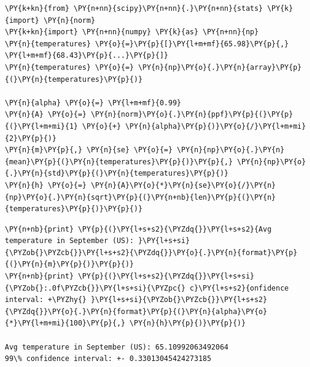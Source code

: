 \begin{Answer}
\begin{tcolorbox}[size=fbox, boxrule=1pt, colback=cellbackground, colframe=cellborder]
\begin{Verbatim}[commandchars=\\\{\}]
\PY{k+kn}{from} \PY{n+nn}{scipy}\PY{n+nn}{.}\PY{n+nn}{stats} \PY{k}{import} \PY{n}{norm}
\PY{k+kn}{import} \PY{n+nn}{numpy} \PY{k}{as} \PY{n+nn}{np}
\PY{n}{temperatures} \PY{o}{=}\PY{p}{[}\PY{l+m+mf}{65.98}\PY{p}{,} \PY{l+m+mf}{68.43}\PY{p}{...}\PY{p}{]}
\PY{n}{temperatures} \PY{o}{=} \PY{n}{np}\PY{o}{.}\PY{n}{array}\PY{p}{(}\PY{n}{temperatures}\PY{p}{)}

\PY{n}{alpha} \PY{o}{=} \PY{l+m+mf}{0.99}
\PY{n}{A} \PY{o}{=} \PY{n}{norm}\PY{o}{.}\PY{n}{ppf}\PY{p}{(}\PY{p}{(}\PY{l+m+mi}{1} \PY{o}{+} \PY{n}{alpha}\PY{p}{)}\PY{o}{/}\PY{l+m+mi}{2}\PY{p}{)}
\PY{n}{m}\PY{p}{,} \PY{n}{se} \PY{o}{=} \PY{n}{np}\PY{o}{.}\PY{n}{mean}\PY{p}{(}\PY{n}{temperatures}\PY{p}{)}\PY{p}{,} \PY{n}{np}\PY{o}{.}\PY{n}{std}\PY{p}{(}\PY{n}{temperatures}\PY{p}{)}
\PY{n}{h} \PY{o}{=} \PY{n}{A}\PY{o}{*}\PY{n}{se}\PY{o}{/}\PY{n}{np}\PY{o}{.}\PY{n}{sqrt}\PY{p}{(}\PY{n+nb}{len}\PY{p}{(}\PY{n}{temperatures}\PY{p}{)}\PY{p}{)}
\end{Verbatim}
\end{tcolorbox}

\begin{tcolorbox}[size=fbox, boxrule=1pt, colback=cellbackground, colframe=cellborder]
\begin{Verbatim}[commandchars=\\\{\}]
\PY{n+nb}{print} \PY{p}{(}\PY{l+s+s2}{\PYZdq{}}\PY{l+s+s2}{Avg temperature in September (US): }\PY{l+s+si}{\PYZob{}\PYZcb{}}\PY{l+s+s2}{\PYZdq{}}\PY{o}{.}\PY{n}{format}\PY{p}{(}\PY{n}{m}\PY{p}{)}\PY{p}{)} 
\PY{n+nb}{print} \PY{p}{(}\PY{l+s+s2}{\PYZdq{}}\PY{l+s+si}{\PYZob{}:.0f\PYZcb{}}\PY{l+s+si}{\PYZpc{} c}\PY{l+s+s2}{onfidence interval: +\PYZhy{} }\PY{l+s+si}{\PYZob{}\PYZcb{}}\PY{l+s+s2}{\PYZdq{}}\PY{o}{.}\PY{n}{format}\PY{p}{(}\PY{n}{alpha}\PY{o}{*}\PY{l+m+mi}{100}\PY{p}{,} \PY{n}{h}\PY{p}{)}\PY{p}{)}

Avg temperature in September (US): 65.10992063492064
99\% confidence interval: +- 0.33013045424273185
\end{Verbatim}
\end{tcolorbox}
\end{Answer}

